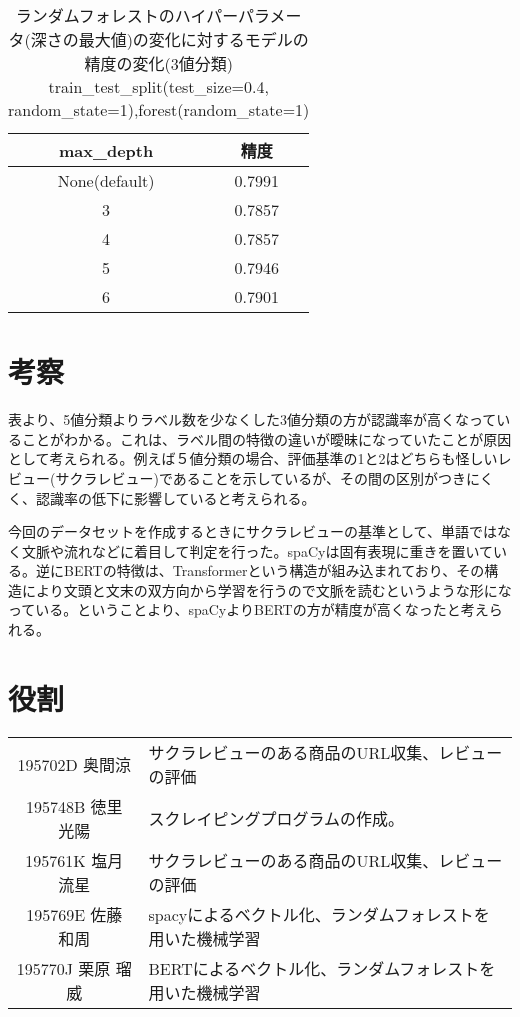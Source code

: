 \documentclass[a4paper,11pt,titlepage]{jsarticle}
\begin{document}
\begin{table}[H]
	\centering
	\caption{ランダムフォレストのハイパーパラメータ(深さの最大値)の変化に対するモデルの精度の変化(3値分類)\\
train\_test\_split(test\_size=0.4, random\_state=1),forest(random\_state=1)}
	\label{ber3_hp}
	\begin{tabular}{|c|c|}
		\hline
		max\_depth & 精度\\
		\hline
		\hline
		None(default) & 0.7991 \\
		\hline
		3 & 0.7857 \\
		\hline
		4 & 0.7857 \\
		\hline
		5 & 0.7946 \\
		\hline
		6 & 0.7901 \\
		\hline
	\end{tabular}
\end{table}





\section{考察}
表より、5値分類よりラベル数を少なくした3値分類の方が認識率が高くなっていることがわかる。これは、ラベル間の特徴の違いが曖昧になっていたことが原因として考えられる。例えば５値分類の場合、評価基準の1と2はどちらも怪しいレビュー(サクラレビュー)であることを示しているが、その間の区別がつきにくく、認識率の低下に影響していると考えられる。

今回のデータセットを作成するときにサクラレビューの基準として、単語ではなく文脈や流れなどに着目して判定を行った。spaCyは固有表現に重きを置いている。逆にBERTの特徴は、Transformerという構造が組み込まれており、その構造により文頭と文末の双方向から学習を行うので文脈を読むというような形になっている。ということより、spaCyよりBERTの方が精度が高くなったと考えられる。

\section{役割}
\begin{table}[H]
	\centering
	\label{role}
	\begin{tabular}{c|l}
		195702D 奥間涼 & サクラレビューのある商品のURL収集、レビューの評価\\
		195748B 徳里 光陽 & スクレイピングプログラムの作成。\\
		195761K 塩月 流星 & サクラレビューのある商品のURL収集、レビューの評価\\
		195769E 佐藤 和周 & spacyによるベクトル化、ランダムフォレストを用いた機械学習\\
		195770J 栗原 瑠威 & BERTによるベクトル化、ランダムフォレストを用いた機械学習\\
	\end{tabular}
\end{table}
\end{document}
